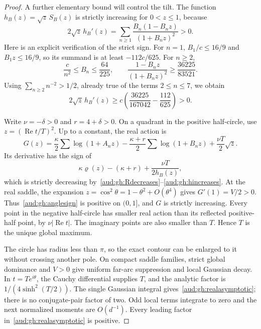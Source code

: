 \documentclass[11pt,a4paper]{article}
\numberwithin{equation}{section}
\begin{document}
\begin{proof}
A further elementary bound will control the tilt.  The function
$h_B(z)=\sqrt z\,S_B(z)$ is strictly increasing for $0<z\le1$, because
\[
 2\sqrt z\,h_B'(z)
 =\sum_{n\ge1}\frac{B_n(1-B_nz)}{(1+B_nz)^2}>0.
\]
Here is an explicit verification of the strict sign.  For $n=1$,
$B_1/c\le16/9$ and $B_1z\le16/9$, so its summand is at least
$-112c/625$.  For $n\ge2$,
\[
 \frac c{n^2}\le B_n\le\frac{64}{225},\qquad
 \frac{1-B_nz}{(1+B_nz)^2}\ge\frac{36225}{83521}.
\]
Using $\sum_{n\ge2}n^{-2}>1/2$, already true of the terms $2\le n\le7$,
we obtain
\begin{equation}\label{aud:gh:hincreases}
 2\sqrt z\,h_B'(z)
 \ge c\left(\frac{36225}{167042}-\frac{112}{625}\right)>0.
\end{equation}

Write $\nu=-\delta>0$ and $r=4+\delta>0$.  On a quadrant in the positive
half-circle, use $z=(\operatorname{Re}t/T)^2$.  Up to a constant, the real
action is
\[
 G(z)=\frac\kappa2\sum\log(1+A_nz)
       -\frac{\kappa+r}{2}\sum\log(1+B_nz)
       +\frac{\nu T}{2}\sqrt z.
\]
Its derivative has the sign of
\begin{equation}\label{aud:gh:anglesign}
 \kappa\varrho(z)-(\kappa+r)+\frac{\nu T}{2h_B(z)},
\end{equation}
which is strictly decreasing by~\eqref{aud:gh:Rdecreases}--\eqref{aud:gh:hincreases}.
At the real saddle, the expansion $z=\cos^2\theta=1-\theta^2+O(\theta^4)$
gives $G'(1)=V/2>0$.  Thus~\eqref{aud:gh:anglesign} is positive on $(0,1]$,
and $G$ is strictly increasing.  Every point in the negative half-circle
has smaller real action than its reflected positive-half point, by
$\nu|\operatorname{Re}t|$.  The imaginary points are also smaller than
$T$.  Hence $T$ is the unique global maximum.

The circle has radius less than $\pi$, so the exact contour can be enlarged
to it without crossing another pole.  On compact saddle families,
strict global dominance and $V>0$ give uniform far-arc suppression and
local Gaussian decay.  In $t=Te^{i\theta}$, the Cauchy differential supplies
$T$, and the analytic factor is $1/(4\sinh^2(T/2))$.  The single Gaussian
integral gives~\eqref{aud:gh:realasymptotic}; there is no conjugate-pair factor
of two.  Odd local terms integrate to zero and the next normalized moments
are $O(d^{-1})$.  Every leading factor in~\eqref{aud:gh:realasymptotic} is
positive.
\end{proof}
\end{document}
